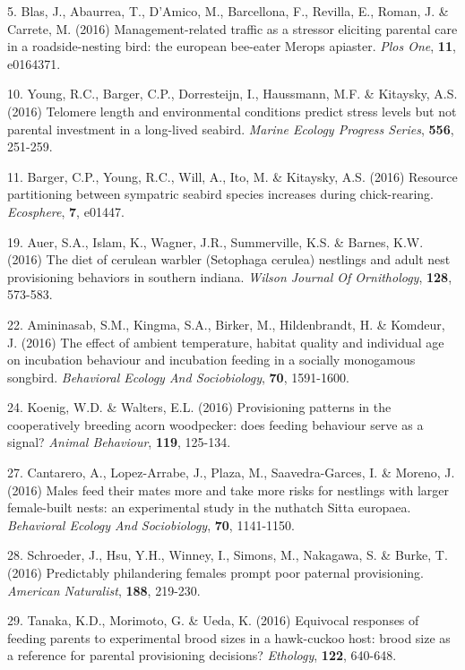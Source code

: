 5. Blas, J., Abaurrea, T., D'Amico, M., Barcellona, F., Revilla, E., Roman, J. \&  Carrete, M. (2016) Management-related traffic as a stressor eliciting parental care in a roadside-nesting bird: the european bee-eater Merops apiaster. \textit{Plos One},  \textbf{11}, e0164371.

10. Young, R.C., Barger, C.P., Dorresteijn, I., Haussmann, M.F. \&  Kitaysky, A.S. (2016) Telomere length and environmental conditions predict stress levels but not parental investment in a long-lived seabird. \textit{Marine Ecology Progress Series},  \textbf{556}, 251-259.

11. Barger, C.P., Young, R.C., Will, A., Ito, M. \&  Kitaysky, A.S. (2016) Resource partitioning between sympatric seabird species increases during chick-rearing. \textit{Ecosphere},  \textbf{7}, e01447.

19. Auer, S.A., Islam, K., Wagner, J.R., Summerville, K.S. \&  Barnes, K.W. (2016) The diet of cerulean warbler (Setophaga cerulea) nestlings and adult nest provisioning behaviors in southern indiana. \textit{Wilson Journal Of Ornithology},  \textbf{128}, 573-583.

22. Amininasab, S.M., Kingma, S.A., Birker, M., Hildenbrandt, H. \&  Komdeur, J. (2016) The effect of ambient temperature, habitat quality and individual age on incubation behaviour and incubation feeding in a socially monogamous songbird. \textit{Behavioral Ecology And Sociobiology},  \textbf{70}, 1591-1600.

24. Koenig, W.D. \&  Walters, E.L. (2016) Provisioning patterns in the cooperatively breeding acorn woodpecker: does feeding behaviour serve as a signal? \textit{Animal Behaviour},  \textbf{119}, 125-134.

27. Cantarero, A., Lopez-Arrabe, J., Plaza, M., Saavedra-Garces, I. \&  Moreno, J. (2016) Males feed their mates more and take more risks for nestlings with larger female-built nests: an experimental study in the nuthatch Sitta europaea. \textit{Behavioral Ecology And Sociobiology},  \textbf{70}, 1141-1150.

28. Schroeder, J., Hsu, Y.H., Winney, I., Simons, M., Nakagawa, S. \&  Burke, T. (2016) Predictably philandering females prompt poor paternal provisioning. \textit{American Naturalist},  \textbf{188}, 219-230.

29. Tanaka, K.D., Morimoto, G. \&  Ueda, K. (2016) Equivocal responses of feeding parents to experimental brood sizes in a hawk-cuckoo host: brood size as a reference for parental provisioning decisions? \textit{Ethology},  \textbf{122}, 640-648.


